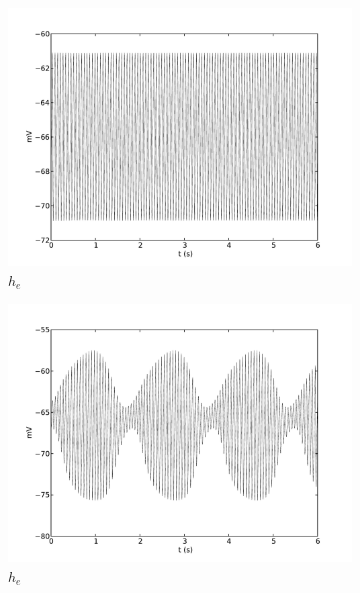 \documentclass[a4paper,12pt]{article}
\begin{document}
\begin{figure}
	\begin{subfigure}[b]{0.5\textwidth}
		\includegraphics[scale=0.32]{frontiers-2012-images-revised/effect_gamma_ee_yml-00416_ode-phi-burst_yml-phi-mod-1_2-2-1-_yml-he-phi.pdf}
		\caption{$h_e$}
	\end{subfigure}
	\begin{subfigure}[b]{0.5\textwidth}
		\includegraphics[scale=0.32]{frontiers-2012-images-revised/effect_gamma_ee_yml-00416_ode-phi-burst_yml-phi-mod-1_1-2-1-_yml-he-phi.pdf}
		\caption{$h_e$}
	\end{subfigure}
	\begin{subfigure}[b]{0.5\textwidth}

\end{subfigure}
\end{figure}
\end{document}
